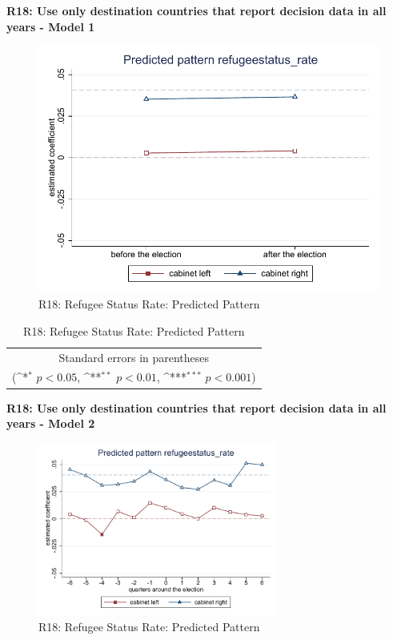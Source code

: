 \documentclass[10pt,a4paper]{scrartcl}
\begin{document}
\clearpage
\textbf{R18: Use only destination countries that report decision data in all years - Model 1}
\begin{figure}[!ht]
	\centering
	\includegraphics[width=1\textwidth]{figures_edited/refugeestatus_rate_graph1_R18.pdf}
	\caption{R18: Refugee Status Rate: Predicted Pattern}
\end{figure}

\begin{table}[!ht]\centering
	\renewcommand{\arraystretch}{1.25}
	\def\sym#1{\ifmmode^{#1}\else\(^{#1}\)\fi}
	\caption{R18: Refugee Status Rate: Predicted Pattern}
	\begin{tabular}{l*{2}{c}}
		\hline\hline
		
		\hline\hline
		\multicolumn{3}{c}{\footnotesize Standard errors in parentheses} \\
		\multicolumn{3}{c}{\footnotesize (\sym{*} \(p<0.05\), \sym{**} \(p<0.01\), \sym{***} \(p<0.001\))}\\
	\end{tabular}
\end{table}

\clearpage
\textbf{R18: Use only destination countries that report decision data in all years - Model 2}
\begin{figure}[!ht]
	\centering
	\includegraphics[width=0.7\textwidth]{figures_edited/refugeestatus_rate_graph2_R18.pdf}
	\caption{R18: Refugee Status Rate: Predicted Pattern}
\end{figure}
\end{document}
